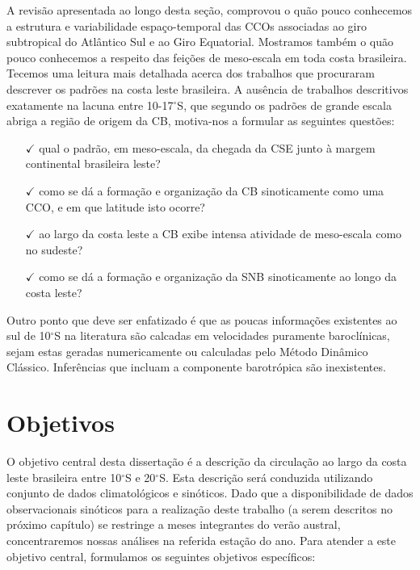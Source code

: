 A revisão apresentada ao longo desta seção, comprovou o quão pouco conhecemos a estrutura
e variabilidade espaço-temporal das CCOs associadas ao 
giro subtropical do Atlântico Sul e ao Giro Equatorial. Mostramos também o quão pouco conhecemos
a respeito das feições de meso-escala em toda costa brasileira. Tecemos uma leitura
mais detalhada acerca dos trabalhos que procuraram descrever os padrões na 
costa leste brasileira. A ausência de trabalhos descritivos exatamente
na lacuna entre 10-17$^\circ$S, que segundo os padrões de grande escala abriga  
a região de origem da CB, motiva-nos a formular as seguintes questões: 

\begin{itemize}

\item[$\checkmark$] qual o padrão, em meso-escala, da chegada da CSE junto à margem continental brasileira leste?

\item[$\checkmark$] como se dá a formação e organização da CB sinoticamente como uma CCO, e em que latitude isto ocorre?

\item[$\checkmark$] ao largo da costa leste a CB exibe intensa atividade de meso-escala como no
sudeste? 

\item[$\checkmark$] como se dá a formação e organização da SNB sinoticamente ao longo da costa leste? 

\end{itemize}

Outro ponto que deve ser enfatizado é que as poucas informações existentes ao sul de 10$^\circ$S na literatura são 
calcadas em velocidades puramente baroclínicas, sejam estas geradas numericamente ou calculadas
pelo Método Dinâmico Clássico. Inferências que incluam a componente barotrópica são inexistentes. 

\section{Objetivos}\label{sec:obj}

\hspace{6mm} O objetivo central desta dissertação é a descrição da circulação ao largo da costa leste brasileira
entre 10$^\circ$S e 20$^\circ$S. Esta descrição será conduzida utilizando conjunto de dados climatológicos e sinóticos.
 Dado que a disponibilidade de dados observacionais sinóticos
 para a realização deste trabalho (a serem descritos no próximo capítulo) se restringe a meses integrantes
do verão austral, concentraremos nossas análises na referida estação do ano. 
Para atender a este objetivo central, formulamos os seguintes objetivos específicos:

